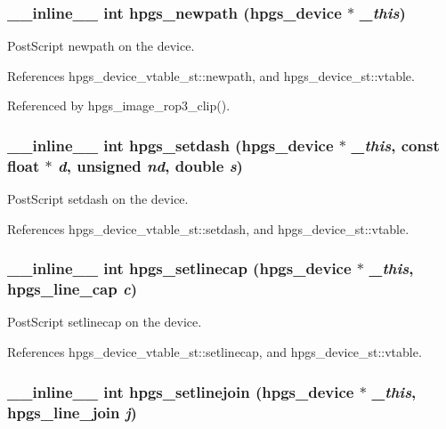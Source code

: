 \subsubsection[hpgs\_\-newpath]{\setlength{\rightskip}{0pt plus 5cm}\_\-\_\-inline\_\-\_\- int hpgs\_\-newpath ({\bf hpgs\_\-device} $\ast$ {\em \_\-this})\hspace{0.3cm}{\tt  [static]}}\label{group__device_g1554a8f559ab553dc6de4f2be0171e95}


PostScript newpath on the device. 

References hpgs\_\-device\_\-vtable\_\-st::newpath, and hpgs\_\-device\_\-st::vtable.

Referenced by hpgs\_\-image\_\-rop3\_\-clip().
\subsubsection[hpgs\_\-setdash]{\setlength{\rightskip}{0pt plus 5cm}\_\-\_\-inline\_\-\_\- int hpgs\_\-setdash ({\bf hpgs\_\-device} $\ast$ {\em \_\-this}, \/  const float $\ast$ {\em d}, \/  unsigned {\em nd}, \/  double {\em s})\hspace{0.3cm}{\tt  [static]}}\label{group__device_geb45fb830feaa389fe0aa766fed262d7}


PostScript setdash on the device. 

References hpgs\_\-device\_\-vtable\_\-st::setdash, and hpgs\_\-device\_\-st::vtable.
\subsubsection[hpgs\_\-setlinecap]{\setlength{\rightskip}{0pt plus 5cm}\_\-\_\-inline\_\-\_\- int hpgs\_\-setlinecap ({\bf hpgs\_\-device} $\ast$ {\em \_\-this}, \/  {\bf hpgs\_\-line\_\-cap} {\em c})\hspace{0.3cm}{\tt  [static]}}\label{group__device_gc6377b47ea8bb7cdf91edb3c87ff62f4}


PostScript setlinecap on the device. 

References hpgs\_\-device\_\-vtable\_\-st::setlinecap, and hpgs\_\-device\_\-st::vtable.
\subsubsection[hpgs\_\-setlinejoin]{\setlength{\rightskip}{0pt plus 5cm}\_\-\_\-inline\_\-\_\- int hpgs\_\-setlinejoin ({\bf hpgs\_\-device} $\ast$ {\em \_\-this}, \/  {\bf hpgs\_\-line\_\-join} {\em j})\hspace{0.3cm}{\tt  [static]}}\label{group__device_g03f06fc1905181c70923a4a50432e261}


